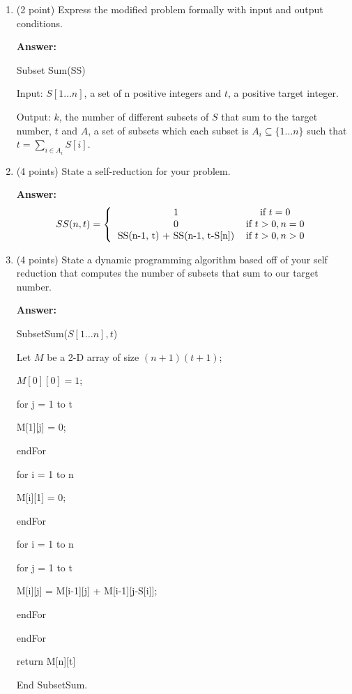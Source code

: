 \documentclass[paper=a4, fontsize=11pt]{scrartcl}
\newcommand\tab[1][0.6cm]{\hspace*{#1}}
\numberwithin{equation}{section}		%
\numberwithin{figure}{section}			%
\numberwithin{table}{section}				%
\begin{document}
\begin{enumerate}
\item (2 point) Express the modified problem formally with input and output conditions.

\textbf{Answer:}

Subset Sum(SS)

Input: $S[1\dots n]$, a set of n positive integers and $t$, a positive target integer.

Output: $k$, the number of different subsets of $S$ that sum to the target number, $t$ and $A$, a set of subsets which each subset is $A_i \subseteq \{1\dots n\}$ such that $t =\displaystyle\sum_{i\in A_i} S[i]$.


\item (4 points) State a self-reduction for your problem.

\textbf{Answer:}
\[
SS(n, t) = \left\{
\begin{tabular}{cc}
1 & \text{if} $t = 0$ \\
0 & \text{if} $t>0, n=0$ \\
SS(n-1, t) + SS(n-1, t-S[n]) & \text{if} $t>0, n>0$ \\
\end{tabular}\right.
\]

\item (4 points) State a dynamic programming algorithm based off of your self reduction that computes the number of subsets that sum to our target number.

\textbf{Answer:}

SubsetSum($S[1\dots n], t$)

\tab Let $M$ be a 2-D array of size $(n+1)(t+1)$;

\tab $M[0][0]= 1$;

\tab for j = 1 to t

\tab \tab M[1][j] = 0;

\tab endFor

\tab for i = 1 to n

\tab \tab M[i][1] = 0;

\tab endFor

\tab for i = 1 to n

\tab \tab for j = 1 to t

\tab \tab \tab M[i][j] = M[i-1][j] + M[i-1][j-S[i]];

\tab \tab endFor

\tab endFor

\tab return M[n][t]

End SubsetSum.



\end{enumerate}
\end{document}
